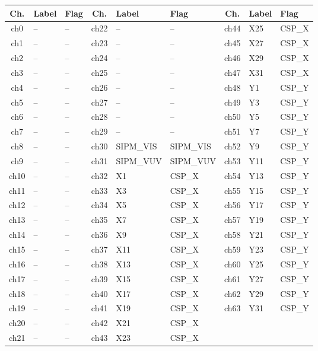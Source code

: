 \begin{table}
\centering
\begin{tabular}{c l l c l l c l l}
\toprule
\textbf{Ch.} & \textbf{Label} & \textbf{Flag} & 
\textbf{Ch.} & \textbf{Label} & \textbf{Flag} & 
\textbf{Ch.} & \textbf{Label} & \textbf{Flag} \\
\midrule
ch0 & -- & -- & ch22 & -- & -- & ch44 & X25 & CSP\_X \\
ch1 & -- & -- & ch23 & -- & -- & ch45 & X27 & CSP\_X \\
ch2 & -- & -- & ch24 & -- & -- & ch46 & X29 & CSP\_X \\
ch3 & -- & -- & ch25 & -- & -- & ch47 & X31 & CSP\_X \\
ch4 & -- & -- & ch26 & -- & -- & ch48 & Y1 & CSP\_Y \\
ch5 & -- & -- & ch27 & -- & -- & ch49 & Y3 & CSP\_Y \\
ch6 & -- & -- & ch28 & -- & -- & ch50 & Y5 & CSP\_Y \\
ch7 & -- & -- & ch29 & -- & -- & ch51 & Y7 & CSP\_Y \\
ch8 & -- & -- & ch30 & SIPM\_VIS & SIPM\_VIS & ch52 & Y9 & CSP\_Y \\
ch9 & -- & -- & ch31 & SIPM\_VUV & SIPM\_VUV & ch53 & Y11 & CSP\_Y \\
ch10 & -- & -- & ch32 & X1 & CSP\_X & ch54 & Y13 & CSP\_Y \\
ch11 & -- & -- & ch33 & X3 & CSP\_X & ch55 & Y15 & CSP\_Y \\
ch12 & -- & -- & ch34 & X5 & CSP\_X & ch56 & Y17 & CSP\_Y \\
ch13 & -- & -- & ch35 & X7 & CSP\_X & ch57 & Y19 & CSP\_Y \\
ch14 & -- & -- & ch36 & X9 & CSP\_X & ch58 & Y21 & CSP\_Y \\
ch15 & -- & -- & ch37 & X11 & CSP\_X & ch59 & Y23 & CSP\_Y \\
ch16 & -- & -- & ch38 & X13 & CSP\_X & ch60 & Y25 & CSP\_Y \\
ch17 & -- & -- & ch39 & X15 & CSP\_X & ch61 & Y27 & CSP\_Y \\
ch18 & -- & -- & ch40 & X17 & CSP\_X & ch62 & Y29 & CSP\_Y \\
ch19 & -- & -- & ch41 & X19 & CSP\_X & ch63 & Y31 & CSP\_Y \\
ch20 & -- & -- & ch42 & X21 & CSP\_X & & & \\
ch21 & -- & -- & ch43 & X23 & CSP\_X & & & \\
\bottomrule
\end{tabular}


\end{table}
